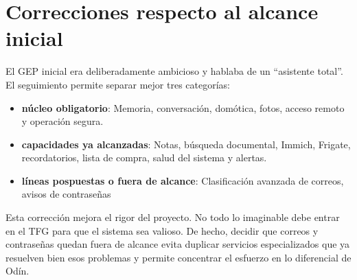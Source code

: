 \section{Correcciones respecto al alcance inicial}
El GEP inicial era deliberadamente ambicioso y hablaba de un ``asistente total''. El seguimiento permite separar mejor tres categorías:
\begin{itemize}
  \item \textbf{núcleo obligatorio}: Memoria, conversación, domótica, fotos, acceso remoto y operación segura.
  \item \textbf{capacidades ya alcanzadas}: Notas, búsqueda documental, Immich, Frigate, recordatorios, lista de compra, salud del sistema y alertas.
  \item \textbf{líneas pospuestas o fuera de alcance}: Clasificación avanzada de correos, avisos de contraseñas
\end{itemize}

Esta corrección mejora el rigor del proyecto. No todo lo imaginable debe entrar en el TFG para que el sistema sea valioso. De hecho, decidir que correos y contraseñas quedan fuera de alcance evita duplicar servicios especializados que ya resuelven bien esos problemas y permite concentrar el esfuerzo en lo diferencial de Odín.

